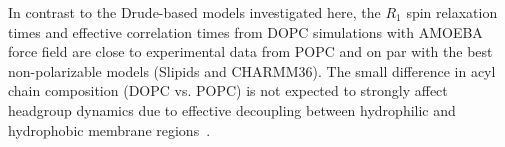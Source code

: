 \documentclass[journal=jacsat,manuscript=article,layout=singlecolumn]{achemso}
\begin{document}
In contrast to the Drude-based models investigated here, the $R_1$ spin relaxation times and effective correlation times from DOPC simulations with AMOEBA force field are close to experimental data from POPC and on par with the best non-polarizable models (Slipids and CHARMM36). The small difference in acyl chain composition (DOPC vs. POPC) is not expected to strongly affect headgroup dynamics due to effective decoupling between hydrophilic and hydrophobic membrane regions~\cite{Antila2022rot, Klauda08}.

\end{document}

